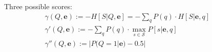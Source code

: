 \documentclass[runningheads]{llncs}
\begin{document}
	
	Three possible scores:
	\begin{eqnarray}
		\gamma(Q,\bm{e}) := -H[S|Q,\bm{e}] = -\sum_q P(q) \cdot H[S|\bm{e},q]&&\\
		\gamma'(Q,\bm{e}) :=  -\sum_q P(q) \cdot \max_{s\in\mathcal{S}}  P[s|\bm{e},q]&&\\
		\gamma''(Q,\bm{e}) :=  |P(Q=1|\bm{e})-0.5|&&
	\end{eqnarray}
	
	
	
	
	
\end{document}
